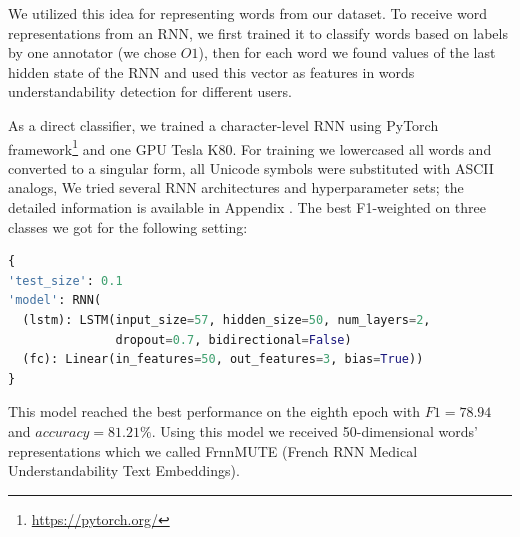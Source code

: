 We utilized this idea for representing words from our dataset. To receive word representations from an RNN, we first trained it to classify words based on labels by one annotator (we chose $O1$), then for each word we found values of the last hidden state of the RNN and used this vector as features in words understandability detection for different users.

As a direct classifier, we trained a character-level RNN using PyTorch framework\footnote{\url{https://pytorch.org/}} and one GPU Tesla K80. For training we lowercased all words and converted to a singular form, all Unicode symbols were substituted with ASCII analogs,  We tried several RNN architectures and hyperparameter sets; the detailed information is available in Appendix \label{appx:rnn}. The best F1-weighted on three classes we got for the following setting:
\begin{lstlisting}[language=Python]
{
'test_size': 0.1
'model': RNN(
  (lstm): LSTM(input_size=57, hidden_size=50, num_layers=2,
               dropout=0.7, bidirectional=False)
  (fc): Linear(in_features=50, out_features=3, bias=True))
}
\end{lstlisting}

This model reached the best performance on the eighth epoch with $F1= 78.94$ and $accuracy= 81.21\%$. Using this model we received 50-dimensional words' representations which we called FrnnMUTE (French RNN Medical Understandability Text Embeddings). 




